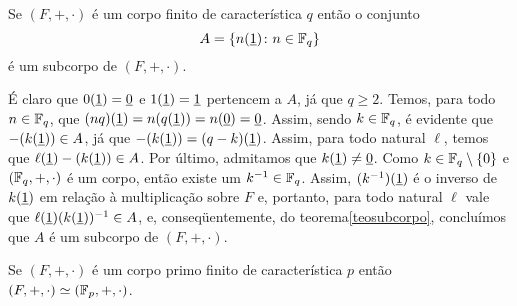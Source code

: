\begin{Lem}\label{lemtcsg}
  Se $(F,+,\cdot)$ é um corpo finito de característica $q$
  então o conjunto
  \begin{equation*}
    A = \left\{ n(\underline{1})\colon n\in\mathbb{F}_{q} \right\}
  \end{equation*}
  é um subcorpo de $(F,+,\cdot)$.
\end{Lem}

\begin{dem}
  É claro que $0(\underline{1})=\underline{0}$ e $1(\underline{1})=\underline{1}$ pertencem a $A$, já que
  $q\geq 2$. Temos, para todo $n\in\mathbb{F}_{q}$, que
  $(nq)(\underline{1})=n(q(\underline{1}))=n(\underline{0})=\underline{0}$. Assim, sendo $k\in\mathbb{F}_{q}$,
  é evidente que $-(k(\underline{1}))\in A$, já que
  $-(k(\underline{1}))=(q-k)(\underline{1})$. Assim, para todo natural $\ell$, temos que
  $\ell(\underline{1})-(k(\underline{1}))\in A$. Por último, admitamos que
  $k(\underline{1})\neq\underline{0}$. Como $k\in\mathbb{F}_{q}\setminus\left\{ 0 \right\}$ e
  $(\mathbb{F}_{q},+,\cdot)$ é um
  corpo, então
  existe um $k^{-1}\in\mathbb{F}_{q}$.
  Assim, $(k^{-1})(\underline{1})$ é o inverso de $k(\underline{1})$ em relação à
  multiplicação sobre $F$ e, portanto, para todo natural $\ell$ vale que
  $\ell(\underline{1})(k(\underline{1}))^{-1}\in A$, e, conseqüentemente, do
  teorema\xspace\ref{teosubcorpo}, concluímos que $A$ é um subcorpo de
  $(F,+,\cdot)$.
\end{dem}

\begin{Teo}\label{teocorposimeqgalois}
  Se $(F,+,\cdot)$ é um corpo primo finito de característica $p$
  então
  $(F,+,\cdot)\simeq (\mathbb{F}_{p},+,\cdot)$.
\end{Teo}

